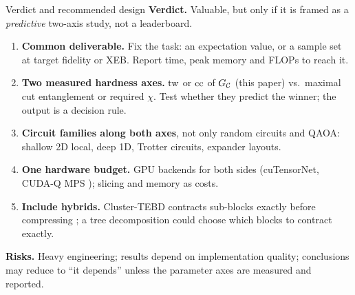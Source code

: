 \begin{frame}{Verdict and recommended design}
    \textbf{Verdict.} Valuable, but only if it is framed as a \emph{predictive} two-axis study, not a leaderboard.
    \begin{enumerate}
        \item \textbf{Common deliverable.} Fix the task: an expectation value, or a sample set at target fidelity or XEB. Report time, peak memory and FLOPs to reach it.
        \item \textbf{Two measured hardness axes.} $\operatorname{tw}$ or $\operatorname{cc}$ of $G_{\mathcal{C}}$ (this paper) vs.\ maximal cut entanglement or required $\chi$. Test whether they predict the winner; the output is a decision rule.
        \item \textbf{Circuit families along both axes}, not only random circuits and QAOA: shallow 2D local, deep 1D, Trotter circuits, expander layouts.
        \item \textbf{One hardware budget.} GPU backends for both sides (cuTensorNet, CUDA-Q MPS \parencite{cudaqmps2025}); slicing and memory as costs.
        \item \textbf{Include hybrids.} Cluster-TEBD contracts sub-blocks exactly before compressing \parencite{clustertebd2025}; a tree decomposition could choose which blocks to contract exactly.
    \end{enumerate}
    \textbf{Risks.} Heavy engineering; results depend on implementation quality; conclusions may reduce to \enquote{it depends} unless the parameter axes are measured and reported.
\end{frame}
